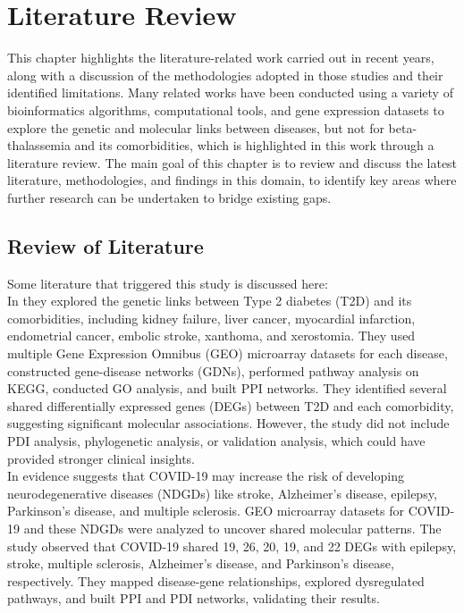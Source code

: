 \let\textcircled=\pgftextcircled
\chapter{Literature Review}
\label{chap:related}
This chapter highlights the literature-related work carried out in recent years, along with a discussion of the methodologies adopted in those studies and their identified limitations. Many related works have been conducted using a variety of bioinformatics algorithms, computational tools, and gene expression datasets to explore the genetic and molecular links between diseases, but not for beta-thalassemia and its comorbidities, which is highlighted in this work through a literature review. The main goal of this chapter is to review and discuss the latest literature, methodologies, and findings in this domain, to identify key areas where further research can be undertaken to bridge existing gaps.

\vspace{2mm}
\newpage

\section{Review of Literature}
\label{sec:sec2_1}
Some literature that triggered this study is discussed here:\\

In \cite{b3} they explored the genetic links between Type 2 diabetes (T2D) and its comorbidities, including kidney failure, liver cancer, myocardial infarction, endometrial cancer, embolic stroke, xanthoma, and xerostomia. They used multiple Gene Expression Omnibus (GEO) microarray datasets for each disease, constructed gene-disease networks (GDNs), performed pathway analysis on KEGG, conducted GO analysis, and built PPI networks. They identified several shared differentially expressed genes (DEGs) between T2D and each comorbidity, suggesting significant molecular associations. However, the study did not include PDI analysis, phylogenetic analysis, or validation analysis, which could have provided stronger clinical insights.\\

In \cite{b10} evidence suggests that COVID-19 may increase the risk of developing neurodegenerative diseases (NDGDs) like stroke, Alzheimer's disease, epilepsy, Parkinson's disease, and multiple sclerosis. GEO microarray datasets for COVID-19 and these NDGDs were analyzed to uncover shared molecular patterns. The study observed that COVID-19 shared 19, 26, 20, 19, and 22 DEGs with epilepsy, stroke, multiple sclerosis, Alzheimer's disease, and Parkinson's disease, respectively. They mapped disease-gene relationships, explored dysregulated pathways, and built PPI and PDI networks, validating their results.\\


